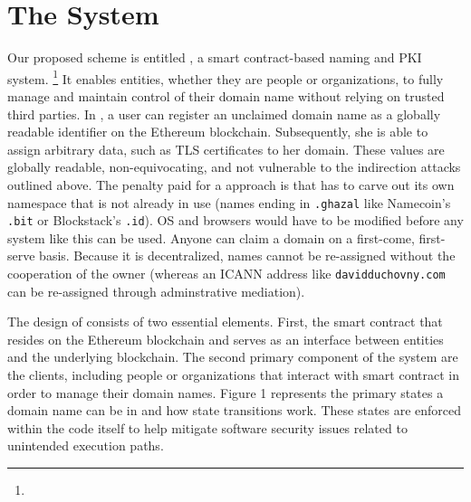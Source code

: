 
\section{The \Ghazal System}

Our proposed scheme is entitled \Ghazal, a smart contract-based naming and PKI \UA system. \footnote{\GhazalCode} It enables entities, whether they are people or organizations, to fully manage and maintain control of their domain name without relying on trusted third parties. In \Ghazal, a user can register an unclaimed domain name as a globally readable identifier on the Ethereum blockchain. Subsequently, she is able to assign arbitrary data, such as TLS certificates to her domain. These values are globally readable, non-equivocating, and not vulnerable to the indirection attacks outlined above. The penalty paid for a \UA approach is that \Ghazal has to carve out its own namespace that is not already in use (\eg names ending in \texttt{.ghazal} like Namecoin's \texttt{.bit} or Blockstack's \texttt{.id}). OS and browsers would have to be modified before any system like this can be used. Anyone can claim a domain on a first-come, first-serve basis. Because it is decentralized, names cannot be re-assigned without the cooperation of the owner (whereas an ICANN address like \texttt{davidduchovny.com} can be re-assigned through adminstrative mediation).

The design of \Ghazal consists of two essential elements. First, the smart contract that resides on the Ethereum blockchain and  serves as an  interface between entities and the underlying blockchain. The second primary component of the system are the clients, including people or organizations that interact with \Ghazal smart contract in order to manage their domain names. Figure 1 represents the primary states a domain name can be in and how state transitions work. These states are enforced within the code itself to help mitigate software security issues related to unintended execution paths. 


